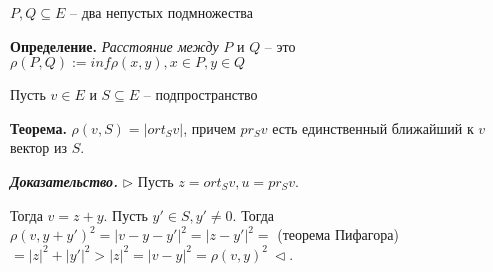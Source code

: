 \vspace{\baselineskip}
$P, Q \subseteq E$ -- два непустых подмножества

\textbf{Определение.} \textit{Расстояние между} $P$ и $Q$ -- это $\rho(P, Q) := inf \rho (x, y), x \in P, y \in Q$

\vspace{\baselineskip}
Пусть $v \in E$ и $S \subseteq E$ -- подпространство

\textbf{Теорема.} $\rho (v, S) = |ort_S v|$, причем $pr_S v$ есть единственный ближайший к $v$ вектор из $S$. 

\vspace{\baselineskip}
\textbf{\textit{Доказательство.}} $\rhd$ Пусть $z = ort_S v, u = pr_S v$.

Тогда $v = z + y$. Пусть $y' \in S, y' \neq 0$. Тогда $\rho (v, y + y')^2 = |v - y - y'|^2 = |z - y'|^2 =$ (теорема Пифагора) $= |z|^2 + |y'|^2 > |z|^2 = |v - y|^2 = \rho (v, y)^2 \ \lhd$.

